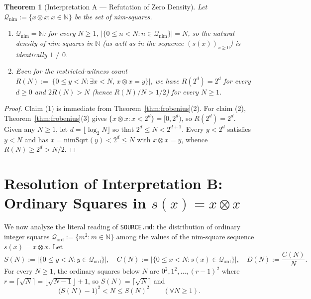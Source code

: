 \documentclass[11pt]{article}
\newtheorem{theorem}{Theorem}[section]
\theoremstyle{definition}
\theoremstyle{remark}
\newcommand{\nimmul}{\otimes}
\newcommand{\N}{\mathbb{N}}
\begin{document}
\begin{theorem}[Interpretation A --- Refutation of Zero Density]\label{thm:interpA}
Let $\mathcal{Q}_{\mathrm{nim}} := \{x \nimmul x : x \in \N\}$ be the set of nim-squares.
\begin{enumerate}
  \item $\mathcal{Q}_{\mathrm{nim}} = \N$: for every $N \ge 1$, $|\{0 \le n < N : n \in \mathcal{Q}_{\mathrm{nim}}\}| = N$, so the natural density of nim-squares in $\N$ (as well as in the sequence $(s(x))_{x \ge 0}$) is identically $1 \neq 0$.
  \item Even for the restricted-witness count $R(N) := |\{0 \le y < N : \exists x < N,\, x \nimmul x = y\}|$, we have $R(2^d) = 2^d$ for every $d \ge 0$ and $2 R(N) > N$ (hence $R(N)/N > 1/2$) for every $N \ge 1$.
\end{enumerate}
\end{theorem}

\begin{proof}
Claim (1) is immediate from Theorem~\ref{thm:frobenius}(2). For claim (2), Theorem~\ref{thm:frobenius}(3) gives $\{x \nimmul x : x < 2^d\} = [0, 2^d)$, so $R(2^d) = 2^d$. Given any $N \ge 1$, let $d = \lfloor \log_2 N \rfloor$ so that $2^d \le N < 2^{d+1}$. Every $y < 2^d$ satisfies $y < N$ and has $x = \mathrm{nimSqrt}(y) < 2^d \le N$ with $x \nimmul x = y$, whence $R(N) \ge 2^d > N/2$.
\end{proof}

\section{Resolution of Interpretation B: Ordinary Squares in \texorpdfstring{$s(x) = x \nimmul x$}{s(x) = x * x}}

We now analyze the literal reading of \texttt{SOURCE.md}: the distribution of ordinary integer squares $\mathcal{Q}_{\mathrm{ord}} := \{m^2 : m \in \N\}$ among the values of the nim-square sequence $s(x) = x \nimmul x$. Let
\[
  S(N) := \bigl|\{0 \le y < N : y \in \mathcal{Q}_{\mathrm{ord}}\}\bigr|, \quad
  C(N) := \bigl|\{0 \le x < N : s(x) \in \mathcal{Q}_{\mathrm{ord}}\}\bigr|, \quad
  D(N) := \frac{C(N)}{N}.
\]
For every $N \ge 1$, the ordinary squares below $N$ are $0^2, 1^2, \dots, (r-1)^2$ where $r = \lceil \sqrt{N} \rceil = \lfloor \sqrt{N-1} \rfloor + 1$, so $S(N) = \lceil \sqrt{N} \rceil$ and
\begin{equation}\label{eq:S-bounds}
  \bigl(S(N) - 1\bigr)^2 < N \le S(N)^2 \qquad (\forall N \ge 1).
\end{equation}
\end{document}
